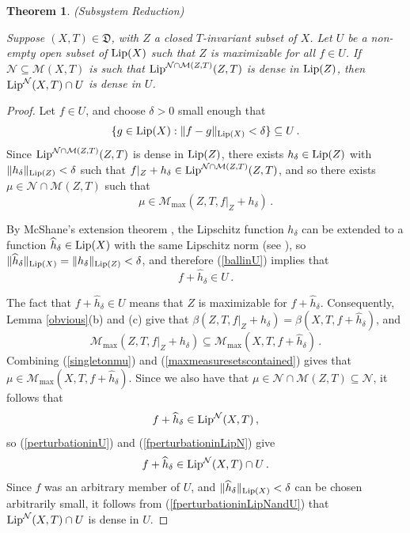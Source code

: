 \documentclass[reqno,11pt]{amsart}
\newtheorem{thm}{Theorem}[section]
\theoremstyle{definition}
\theoremstyle{remark}
\theoremstyle{remark}
\def\m{\mathcal M}
\def\n{\mathcal N}
\def\lip{{\rm Lip}}
\def\D{\mathfrak{D}}
\numberwithin{equation}{section}
\begin{document}
\begin{thm}\label{densedense} (Subsystem Reduction)


\noindent
Suppose $(X,T)\in\D$, with $Z$ a closed $T$-invariant subset of $X$.
Let $U$ be a non-empty open subset of $\lip(X)$ such that $Z$ is maximizable for all $f\in U$.
If $\n\subseteq \m(X,T)$ is such that $\lip^{\n\cap\m(Z,T)}(Z,T)$ is dense in $\lip(Z)$,
then $\lip^\n(X,T) \cap U$ is dense in $U$.
\end{thm}
\begin{proof}
Let $f\in U$, and choose $\delta>0$ small enough that 
\begin{equation}\label{ballinU}
\{g\in\lip(X):\|f-g\|_{\lip(X)}< \delta\} \subseteq U \,.
\end{equation}
Since $\lip^{\n\cap\m(Z,T)}(Z,T)$ is dense in $\lip(Z)$, there exists $h_\delta\in\lip(Z)$ with $\|h_\delta\|_{\lip(Z)}<\delta$
such that $f|_Z + h_\delta \in \lip^{\n\cap\m(Z,T)}(Z,T)$,
and so
there exists $\mu\in\n\cap\m(Z,T)$ such that
\begin{equation}\label{singletonmu}
\mu\in\m_{\max}(Z,T,f|_Z + h_\delta)\,.
\end{equation}

By McShane's extension theorem \cite{Mc34}, the Lipschitz function $h_\delta$ can be extended to a 
function
 $\widehat{h}_\delta\in \lip(X)$ with the same Lipschitz norm (see \cite[Thm.~1.33]{Wea18}),
so $\|\widehat{h}_\delta\|_{\lip(X)} = \|h_\delta\|_{\lip(Z)}<\delta$,
and therefore  (\ref{ballinU}) implies that
\begin{equation}\label{perturbationinU}
f+\widehat{h}_\delta \in U\,.
\end{equation}

The fact that $f+\widehat{h}_\delta \in U$ means that $Z$ is maximizable for  $f+\widehat{h}_\delta$.
Consequently, Lemma \ref{obvious}(b) and (c) give that $\beta(Z,T,f|_Z+h_\delta)=\beta(X,T,f+\widehat{h}_\delta)$,
and 
\begin{equation}\label{maxmeasuresetscontained}
\m_{\max}(Z,T,f|_Z+h_\delta)\subseteq \m_{\max}(X,T,f+\widehat{h}_\delta)\,.
\end{equation}
Combining (\ref{singletonmu}) and (\ref{maxmeasuresetscontained}) gives that 
$\mu\in  \m_{\max}(X,T,f+\widehat{h}_\delta)$.
Since we also have that
 $\mu\in\n\cap\m(Z,T)\subseteq \n$,
 it follows that
\begin{equation}\label{fperturbationinLipN}
f+\widehat{h}_\delta \in \lip^\n(X,T)\,,
\end{equation}
so
(\ref{perturbationinU}) and (\ref{fperturbationinLipN}) give
\begin{equation}\label{fperturbationinLipNandU}
f+\widehat{h}_\delta \in \lip^\n(X,T) \cap U \,.
\end{equation}
Since $f$ was an arbitrary member of $U$, and $\|\widehat{h}_\delta\|_{\lip(X)}<\delta$ can be chosen arbitrarily small, it follows from (\ref{fperturbationinLipNandU}) that
$\lip^\n(X,T) \cap U$ is dense in $U$.
\end{proof}
\end{document}
